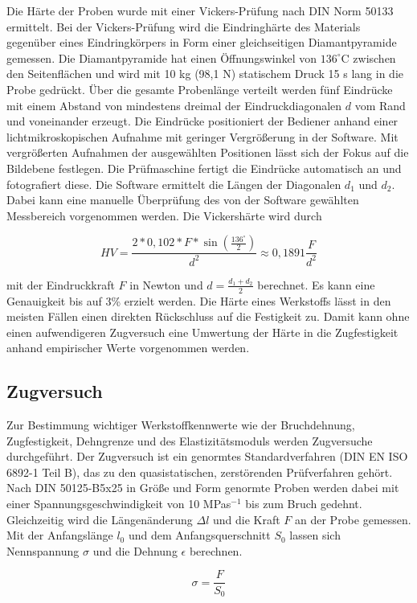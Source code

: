 Die Härte der Proben wurde mit einer Vickers-Prüfung nach DIN Norm 50133 ermittelt. Bei der Vickers-Prüfung wird die Eindringhärte des Materials gegenüber eines Eindringkörpers in Form einer gleichseitigen Diamantpyramide gemessen. Die Diamantpyramide hat einen Öffnungswinkel von $136^\circ$C zwischen den Seitenflächen und wird mit 10 kg (98,1 N) statischem Druck 15 s lang in die Probe gedrückt. Über die gesamte Probenlänge verteilt werden fünf Eindrücke mit einem Abstand von mindestens dreimal der Eindruckdiagonalen $d$ vom Rand und voneinander erzeugt. Die Eindrücke positioniert der Bediener anhand einer lichtmikroskopischen Aufnahme mit geringer Vergrößerung in der Software. Mit vergrößerten Aufnahmen der ausgewählten Positionen lässt sich der Fokus auf die Bildebene festlegen. Die Prüfmaschine fertigt die Eindrücke automatisch an und fotografiert diese. Die Software ermittelt die Längen der Diagonalen $d_1$ und $d_2$. Dabei kann eine manuelle Überprüfung des von der Software gewählten Messbereich vorgenommen werden. Die Vickershärte wird durch

$$HV=\frac {2*0,102*F*\sin \left( \frac{136^\circ}{2}\right) } {d^2} \approx 0,1891 \frac{F}{d^2}$$

mit der Eindruckkraft $F$ in Newton und $d=\frac {d_1 + d_2}{2} $ berechnet. Es kann eine Genauigkeit bis auf 3\% erzielt werden.  Die Härte eines Werkstoffs lässt in den meisten Fällen einen direkten Rückschluss auf die Festigkeit zu. Damit kann ohne einen aufwendigeren Zugversuch eine Umwertung der Härte in die Zugfestigkeit anhand empirischer Werte vorgenommen werden. 

\subsection{Zugversuch}
Zur Bestimmung wichtiger Werkstoffkennwerte wie der Bruchdehnung, Zugfestigkeit, Dehngrenze und des Elastizitätsmoduls werden Zugversuche durchgeführt. Der Zugversuch ist ein genormtes Standardverfahren (DIN EN ISO 6892-1 Teil B), das zu den quasistatischen, zerstörenden Prüfverfahren gehört. Nach DIN 50125-B5x25 in Größe und Form genormte Proben werden dabei mit einer Spannungsgeschwindigkeit von 10 MPas$^{-1}$ bis zum Bruch gedehnt. Gleichzeitig wird die Längenänderung $\Delta l$ und die Kraft $F$ an der Probe gemessen. Mit der Anfangslänge $l_0$ und dem Anfangsquerschnitt $S_0$ lassen sich Nennspannung $\sigma$ und die Dehnung $\epsilon$ berechnen.

$$\sigma=\frac{F}{S_0}$$

